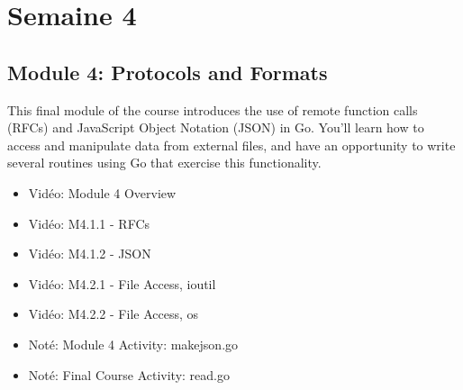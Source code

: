 \section*{Semaine 4}

\subsection*{Module 4: Protocols and Formats}

This final module of the course introduces the use of remote function calls (RFCs) and JavaScript Object Notation (JSON) in Go. You’ll learn how to access and manipulate data from external files, and have an opportunity to write several routines using Go that exercise this functionality.
\begin{multicols}{2}
\begin{itemize}[label={$\bullet$}]
  \item  Vidéo: Module 4 Overview
  \item  Vidéo: M4.1.1 - RFCs
  \item  Vidéo: M4.1.2 - JSON
  \item  Vidéo: M4.2.1 - File Access, ioutil
  \item  Vidéo: M4.2.2 - File Access, os
  \item Noté: Module 4 Activity: makejson.go
  \item Noté: Final Course Activity: read.go
\end{itemize}
\end{multicols}

